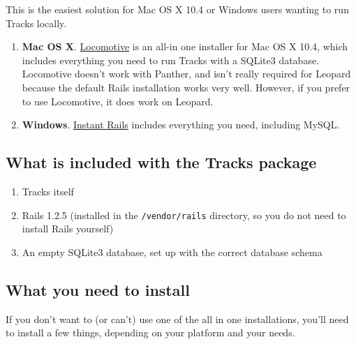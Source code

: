 \documentclass[10pt,twoside]{memoir}
\begin{document}
This is the easiest solution for Mac OS X 10.4 or Windows users wanting to run Tracks locally.


\begin{enumerate}


\item \textbf{Mac OS X}. \href{http://locomotive.sourceforge.net/}{Locomotive} is an all-in one installer for Mac OS X 10.4, which includes everything you need to run Tracks with a SQLite3 database. Locomotive doesn't work with Panther, and isn't really required for Leopard because the default Rails installation works very well. However, if you prefer to use Locomotive, it does work on Leopard.

\item \textbf{Windows}. \href{http://instantrails.rubyforge.org/wiki/wiki.pl}{Instant Rails} includes everything you need, including MySQL.
\end{enumerate}

\subsection{What is included with the Tracks package}
\label{whatisincludedwiththetrackspackage}

\begin{enumerate}


\item Tracks itself

\item Rails 1.2.5 (installed in the \texttt{/vendor/rails} directory, so you do not need to install Rails yourself)

\item An empty SQLite3 database, set up with the correct database schema
\end{enumerate}

\subsection{What you need to install}
\label{whatyouneed}

If you don't want to (or can't) use one of the all in one installations, you'll need to install a few things, depending on your platform and your needs.
\end{document}
